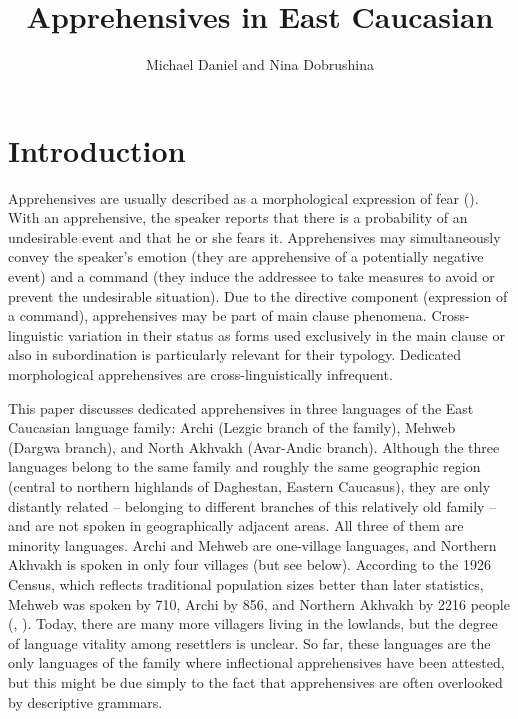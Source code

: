 \documentclass[output=paper,colorlinks,citecolor=brown]{langscibook}
\author{Michael Daniel\affiliation{Collegium de Lyon, University of Lyon} and Nina Dobrushina\affiliation{Laboratoire Dynamique du Langage (CNRS), Lyon}}
\title{Apprehensives in East Caucasian}
\begin{document}
\maketitle


\section{Introduction}

 
Apprehensives are usually described as a morphological expression of fear (\citealt{lichtenberk1995,Dobrushina2006cyrillic,vuillermet2018a,Smith-Dennis2021}). With an apprehensive, the speaker reports that there is a probability of an undesirable event and that he or she fears it. Apprehensives may simultaneously convey the speaker's emotion (they are apprehensive of a potentially negative event) and a command (they induce the addressee to take measures to avoid or prevent the undesirable situation). Due to the directive component (expression of a command), apprehensives may be part of main clause phenomena. Cross-linguistic variation in their status as forms used exclusively in the main clause or also in subordination is particularly relevant for their typology. Dedicated morphological apprehensives are cross-linguistically infrequent. 

This paper discusses dedicated apprehensives in three languages of the East Caucasian language family: Archi (Lezgic branch of the family), Mehweb (Dargwa branch), and North Akhvakh (Avar-Andic branch). Although the three languages belong to the same family and roughly the same geographic region (central to northern highlands of Daghestan, Eastern Caucasus), they are only distantly related -- belonging to different branches of this relatively old family -- and are not spoken in geographically adjacent areas. All three of them are minority languages. Archi and Mehweb are one-village languages, and Northern Akhvakh is spoken in only four villages (but see below). According to the 1926 Census, which reflects traditional population sizes better than later statistics, Mehweb was spoken by 710, Archi by 856, and Northern Akhvakh by 2216 people (\citealt{materials1927}, \citealt{Dobrushinaetal2017}). Today, there are many more villagers living in the lowlands, but the degree of language vitality among resettlers is unclear. So far, these languages are the only languages of the family where inflectional apprehensives have been attested, but this might be due simply to the fact that apprehensives are often overlooked by descriptive grammars.
\end{document}
